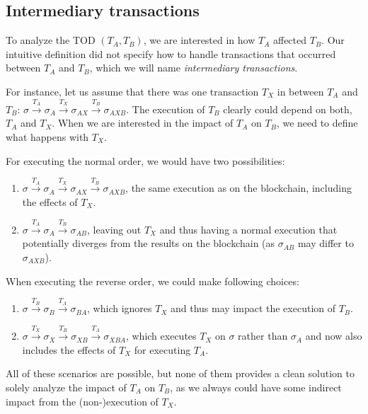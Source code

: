 \documentclass[draft,final]{vutinfth} %
\begin{document}
\subsection{Intermediary transactions}

To analyze the TOD $(T_A, T_B)$, we are interested in how $T_A$ affected $T_B$. Our intuitive definition did not specify how to handle transactions that occurred between $T_A$ and $T_B$, which we will name \emph{intermediary transactions}.

For instance, let us assume that there was one transaction $T_X$ in between $T_A$ and $T_B$: $\sigma \xrightarrow{T_A} \sigma_A \xrightarrow{T_X} \sigma_{AX} \xrightarrow{T_B} \sigma_{AXB}$. The execution of $T_B$ clearly could depend on both, $T_A$ and $T_X$. When we are interested in the impact of $T_A$ on $T_B$, we need to define what happens with $T_X$.

For executing the normal order, we would have two possibilities:

\begin{enumerate}
    \item $\sigma \xrightarrow{T_A} \sigma_A \xrightarrow{T_X} \sigma_{AX} \xrightarrow{T_B} \sigma_{AXB}$, the same execution as on the blockchain, including the effects of $T_X$.
    \item $\sigma \xrightarrow{T_A} \sigma_A \xrightarrow{T_B} \sigma_{AB}$, leaving out $T_X$ and thus having a normal execution that potentially diverges from the results on the blockchain (as $\sigma_{AB}$ may differ to $\sigma_{AXB}$).
\end{enumerate}

When executing the reverse order, we could make following choices:

\begin{enumerate}
    \item $\sigma \xrightarrow{T_B} \sigma_B \xrightarrow{T_A} \sigma_{BA}$, which ignores $T_X$ and thus may impact the execution of $T_B$.
    \item $\sigma \xrightarrow{T_X} \sigma_X \xrightarrow{T_B} \sigma_{XB} \xrightarrow{T_A} \sigma_{XBA}$, which executes $T_X$ on $\sigma$ rather than $\sigma_A$ and now also includes the effects of $T_X$ for executing $T_A$.
\end{enumerate}

All of these scenarios are possible, but none of them provides a clean solution to solely analyze the impact of $T_A$ on $T_B$, as we always could have some indirect impact from the (non-)execution of $T_X$.
\end{document}
